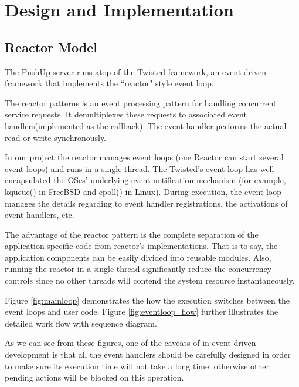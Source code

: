 \section {Design and Implementation\\}

\subsection{Reactor Model\\}
The PushUp server runs atop of the Twisted framework\cite{Twisted}, an 
event driven framework that implements the ``reactor" style event loop.

The reactor patterns is an event processing pattern for handling concurrent
service requests. It demultiplexes these requests to associated event
handlers(implemented as the callback). The event handler performs
the actual read or write synchronously.

In our project the reactor manages event loops (one Reactor 
can start several event loops) and runs in a single thread. The
Twisted's event loop has well encapsulated the OSes' underlying 
event notification mechanism (for example, kqueue() in FreeBSD 
and epoll() in Linux).
During execution, the event loop manages the details regarding to
event handler registrations, the activations of event handlers, etc.

The advantage of the reactor pattern is the complete separation of the 
application specific code from reactor's implementations. That is to
say, the application components can be easily divided into reusable 
modules. Also, running the reactor in a single thread significantly
reduce the concurrency controls since no other threads will contend 
the system resource instantaneously.

Figure \ref{fig:mainloop} demonstrates the how the execution switches
between the event loops and user code. Figure \ref{fig:eventloop_flow} 
further illustrates the detailed work flow with sequence diagram.

As we can see from these figures, one of the caveats of in 
event-driven development is that all the event handlers should 
be carefully designed in order to make sure its execution time 
will not take a long time; otherwise other pending actions will
be blocked on this operation.

